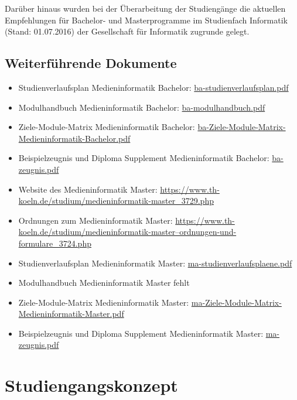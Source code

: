 Darüber hinaus wurden bei der Überarbeitung der Studiengänge die
aktuellen Empfehlungen für Bachelor- und Masterprogramme im Studienfach
Informatik (Stand: 01.07.2016) der Gesellschaft für Informatik zugrunde
gelegt.

\section{Weiterführende
Dokumente}\label{weiterfuxfchrende-dokumente-2}

\begin{itemize}
\tightlist
\item
  Studienverlaufsplan Medieninformatik Bachelor:
  \href{../anhaenge/ba-studienverlaufsplan.pdf}{ba-studienverlaufsplan.pdf}
\item
  Modulhandbuch Medieninformatik Bachelor:
  \href{../anhaenge/ba-modulhandbuch.pdf}{ba-modulhandbuch.pdf}
\item
  Ziele-Module-Matrix Medieninformatik Bachelor:
  \href{../anhaenge/ba-Ziele-Module-Matrix-Medieninformatik-Bachelor.pdf}{ba-Ziele-Module-Matrix-Medieninformatik-Bachelor.pdf}
\item
  Beispielzeugnis und Diploma Supplement Medieninformatik Bachelor:
  \href{../anhaenge/ba-zeugnis.pdf}{ba-zeugnis.pdf}
\item
  Website des Medieninformatik Master:
  \url{https://www.th-koeln.de/studium/medieninformatik-master\_3729.php}
\item
  Ordnungen zum Medieninformatik Master:
  \href{https://www.th-koeln.de/studium/medieninformatik-master--ordnungen-und-formulare_3724.php}{https://www.th-koeln.de/studium/medieninformatik-master--ordnungen-und-formulare\_3724.php}
\item
  Studienverlaufsplan Medieninformatik Master:
  \href{../anhaenge/ma-studienverlaufsplaene.pdf}{ma-studienverlaufsplaene.pdf}
\item
  Modulhandbuch Medieninformatik Master fehlt
\item
  Ziele-Module-Matrix Medieninformatik Master:
  \href{../anhaenge/ma-Ziele-Module-Matrix-Medieninformatik-Master.pdf}{ma-Ziele-Module-Matrix-Medieninformatik-Master.pdf}
\item
  Beispielzeugnis und Diploma Supplement Medieninformatik Master:
  \href{../anhaenge/ma-zeugnis.pdf}{ma-zeugnis.pdf}
\end{itemize}

\chapter{Studiengangskonzept}\label{studiengangskonzept}

